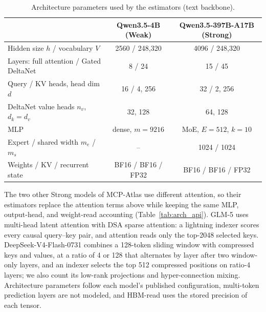 \documentclass[11pt, copyright, logo, secondlogo]{template/lark}
\begin{document}
\begin{table}[h]
\caption{Architecture parameters used by the estimators (text backbone).}
\label{tab:arch}
\centering
\small
\begin{tabular}{@{}lcc@{}}
\toprule
& Qwen3.5-4B (Weak) & Qwen3.5-397B-A17B (Strong) \\
\midrule
Hidden size $h$ / vocabulary $V$ & 2560 / 248{,}320 & 4096 / 248{,}320 \\
Layers: full attention / Gated DeltaNet & 8 / 24 & 15 / 45 \\
Query / KV heads, head dim $d$ & 16 / 4, 256 & 32 / 2, 256 \\
DeltaNet value heads $n_v$, $d_k{=}d_v$ & 32, 128 & 64, 128 \\
MLP & dense, $m=9216$ & MoE, $E=512$, $k=10$ \\
Expert / shared width $m_e$ / $m_s$ & -- & 1024 / 1024 \\
Weights / KV / recurrent state & BF16 / BF16 / FP32 & BF16 / BF16 / FP32 \\
\bottomrule
\end{tabular}
\end{table}

The two other Strong models of MCP-Atlas use different attention, so their
estimators replace the attention terms above while keeping the same MLP,
output-head, and weight-read accounting (Table~\ref{tab:arch_api}). GLM-5
\citep{glm2026glm5} uses multi-head latent attention with DSA sparse
attention: a lightning indexer scores every causal query--key pair, and
attention reads only the top-2048 selected keys. DeepSeek-V4-Flash-0731
\citep{deepseek2026v4} combines a 128-token sliding window with compressed
keys and values, at a ratio of 4 or 128 that alternates by layer after two window-only layers, and an
indexer selects the top 512 compressed positions on ratio-4 layers; we also
count its low-rank projections and hyper-connection mixing. Architecture
parameters follow each model's published configuration, multi-token
prediction layers are not modeled, and HBM-read uses the stored precision of
each tensor.
\end{document}
